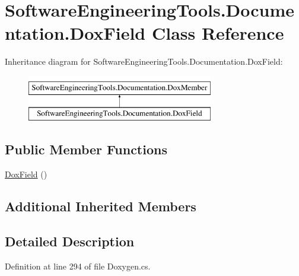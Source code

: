 \hypertarget{class_software_engineering_tools_1_1_documentation_1_1_dox_field}{\section{Software\+Engineering\+Tools.\+Documentation.\+Dox\+Field Class Reference}
\label{class_software_engineering_tools_1_1_documentation_1_1_dox_field}
}
Inheritance diagram for Software\+Engineering\+Tools.\+Documentation.\+Dox\+Field\+:\begin{figure}[H]
\begin{center}
\leavevmode
\includegraphics[height=2.000000cm]{class_software_engineering_tools_1_1_documentation_1_1_dox_field}
\end{center}
\end{figure}
\subsection*{Public Member Functions}
\begin{DoxyCompactItemize}
\item 
\hyperlink{class_software_engineering_tools_1_1_documentation_1_1_dox_field_a5ce4b2384e224643d8dbfd18612e73c5}{Dox\+Field} ()
\end{DoxyCompactItemize}
\subsection*{Additional Inherited Members}


\subsection{Detailed Description}


Definition at line 294 of file Doxygen.\+cs.



